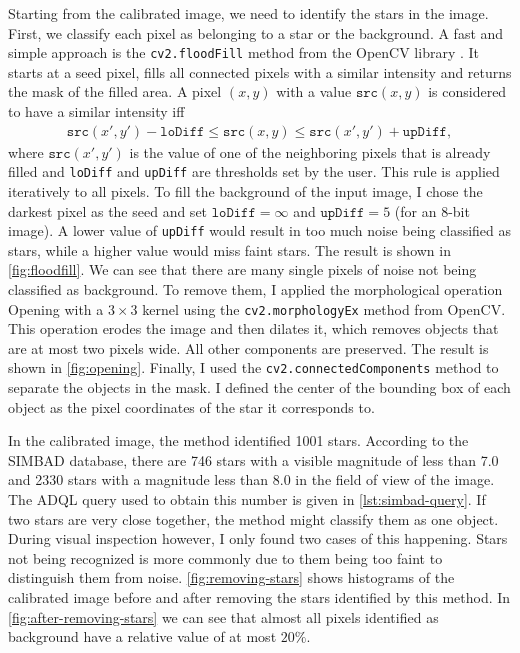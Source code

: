 Starting from the calibrated image, we need to identify the stars in the image. First,
we classify each pixel as belonging to a star or the background. A fast and simple
approach is the \texttt{cv2.floodFill} method from the OpenCV library \cite{opencv2000}.
It starts at a seed pixel, fills all connected pixels with a similar intensity and returns
the mask of the filled area. A pixel $(x, y)$ with a value $\texttt{src}(x, y)$ is
considered to have a similar intensity iff
\begin{align*}
  \texttt{src}(x', y') - \texttt{loDiff} \leq \texttt{src}(x, y) \leq \texttt{src}(x', y') + \texttt{upDiff},
\end{align*}
where $\texttt{src}(x', y')$ is the value of one of the neighboring pixels that is already
filled and \texttt{loDiff} and \texttt{upDiff} are thresholds set by the user. This rule
is applied iteratively to all pixels. To fill the background of the input image, I
chose the darkest pixel as the seed and set $\texttt{loDiff} = \infty$ and
$\texttt{upDiff} = 5$ (for an 8-bit image). A lower value of \texttt{upDiff} would result
in too much noise being classified as stars, while a higher value would miss faint stars.
The result is shown in \autoref{fig:floodfill}. We can see that there are many single
pixels of noise not being classified as background. To remove them, I applied the
morphological operation Opening with a $3 \times 3$ kernel using the
\texttt{cv2.morphologyEx} method from OpenCV. This operation erodes the image and then
dilates it, which removes objects that are at most two pixels wide. All other components
are preserved. The result is shown in \autoref{fig:opening}. Finally, I used the
\texttt{cv2.connectedComponents} method to separate the objects in the mask. I defined the
center of the bounding box of each object as the pixel coordinates of the star it
corresponds to.

In the calibrated image, the method identified 1001 stars. According to the SIMBAD
database, there are 746 stars with a visible magnitude of less than 7.0 and 2330 stars
with a magnitude less than 8.0 in the field of view of the image. The ADQL query used to
obtain this number is given in \autoref{lst:simbad-query}. If two stars are very close
together, the method might classify them as one object. During visual inspection however,
I only found two cases of this happening. Stars not being recognized is more commonly due
to them being too faint to distinguish them from noise. \autoref{fig:removing-stars} shows
histograms of the calibrated image before and after removing the stars identified by this
method. In \autoref{fig:after-removing-stars} we can see that almost all pixels identified
as background have a relative value of at most $20\%$.

